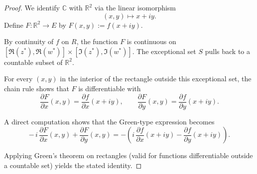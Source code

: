 \documentclass{article}
\begin{document}
\begin{proof}
We identify $\mathbb{C}$ with $\mathbb{R}^2$ via the linear isomorphism
\[
(x,y) \longmapsto x + i y.
\]
Define $F : \mathbb{R}^2 \to E$ by $F(x,y) := f(x+iy)$.

By continuity of $f$ on $R$, the function $F$ is continuous on
$[\Re(z^{\ast}),\Re(w^{\ast})] \times [\Im(z^{\ast}),\Im(w^{\ast})]$.
The exceptional set $S$ pulls back to a countable subset of $\mathbb{R}^2$.

For every $(x,y)$ in the interior of the rectangle outside this exceptional set,
the chain rule shows that $F$ is differentiable with
\[
\frac{\partial F}{\partial x}(x,y)
=
\frac{\partial f}{\partial x}(x+iy),
\qquad
\frac{\partial F}{\partial y}(x,y)
=
\frac{\partial f}{\partial y}(x+iy).
\]

A direct computation shows that the Green-type expression becomes
\[
-\,i\,\frac{\partial F}{\partial x}(x,y)
+
\frac{\partial F}{\partial y}(x,y)
=
-\left(
i\,\frac{\partial f}{\partial x}(x+iy)
-
\frac{\partial f}{\partial y}(x+iy)
\right).
\]

Applying Green's theorem on rectangles (valid for functions differentiable
outside a countable set) yields the stated identity.
\end{proof}
\end{document}
